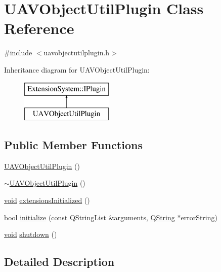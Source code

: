\hypertarget{class_u_a_v_object_util_plugin}{\section{\-U\-A\-V\-Object\-Util\-Plugin \-Class \-Reference}
\label{class_u_a_v_object_util_plugin}
}


{\ttfamily \#include $<$uavobjectutilplugin.\-h$>$}

\-Inheritance diagram for \-U\-A\-V\-Object\-Util\-Plugin\-:\begin{figure}[H]
\begin{center}
\leavevmode
\includegraphics[height=2.000000cm]{class_u_a_v_object_util_plugin}
\end{center}
\end{figure}
\subsection*{\-Public \-Member \-Functions}
\begin{DoxyCompactItemize}
\item 
\hyperlink{group___u_a_v_object_util_plugin_ga3b705535aeae994a52c3d401767492c8}{\-U\-A\-V\-Object\-Util\-Plugin} ()
\item 
\hyperlink{group___u_a_v_object_util_plugin_ga1818db06a0b7162d9b933a9418dee8d6}{$\sim$\-U\-A\-V\-Object\-Util\-Plugin} ()
\item 
\hyperlink{group___u_a_v_objects_plugin_ga444cf2ff3f0ecbe028adce838d373f5c}{void} \hyperlink{group___u_a_v_object_util_plugin_ga644ec0f06cf775004f4f5cd28a60080a}{extensions\-Initialized} ()
\item 
bool \hyperlink{group___u_a_v_object_util_plugin_ga21707781be0dfd017ec41e59ef8bf7af}{initialize} (const \-Q\-String\-List \&arguments, \hyperlink{group___u_a_v_objects_plugin_gab9d252f49c333c94a72f97ce3105a32d}{\-Q\-String} $\ast$error\-String)
\item 
\hyperlink{group___u_a_v_objects_plugin_ga444cf2ff3f0ecbe028adce838d373f5c}{void} \hyperlink{group___u_a_v_object_util_plugin_ga14d874a44f94ae805fa0d683410ccfcb}{shutdown} ()
\end{DoxyCompactItemize}


\subsection{\-Detailed \-Description}


